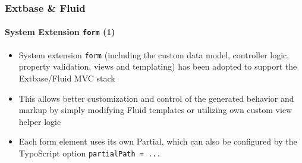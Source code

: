\begin{frame}[fragile]
	\frametitle{Extbase \& Fluid}
	\framesubtitle{System Extension \texttt{form} (1)}

	\begin{itemize}

		\item System extension \texttt{form} (including the custom data model, controller
			logic, property validation, views and templating) has been adopted to support
			the Extbase/Fluid MVC stack

		\item This allows better customization and control of the generated behavior and
			markup by simply modifying Fluid templates or utilizing own custom view helper
			logic

		\item Each form element uses its own Partial, which can also be configured by
			the TypoScript option \texttt{partialPath = ...}

	\end{itemize}

\end{frame}


